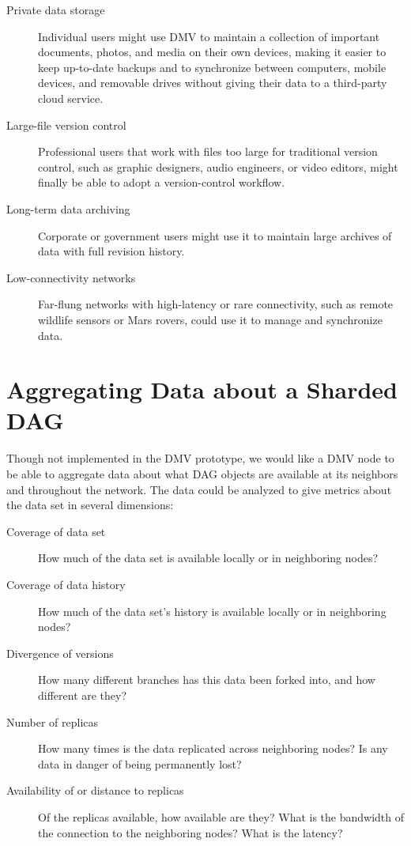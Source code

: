 \begin{description}

    \item[Private data storage] Individual users might use DMV to maintain a
        collection of important documents, photos, and media on their own
        devices, making it easier to keep up-to-date backups and to synchronize
        between computers, mobile devices, and removable drives without giving
        their data to a third-party cloud service.

    \item[Large-file version control] Professional users that work with files
        too large for traditional version control, such as graphic designers,
        audio engineers, or video editors, might finally be able to adopt a
        version-control workflow.

    \item[Long-term data archiving] Corporate or government users might use it
        to maintain large archives of data with full revision history.

    \item[Low-connectivity networks] Far-flung networks with high-latency or
        rare connectivity, such as remote wildlife sensors or Mars rovers, could
        use it to manage and synchronize data.

\end{description}

%


\section{Aggregating Data about a Sharded DAG}

Though not implemented in the DMV prototype, we would like a DMV node to be able
to aggregate data about what DAG objects are available at its neighbors and
throughout the network. The data could be analyzed to give metrics about the
data set in several dimensions:

\begin{description}

  \item[Coverage of data set] How much of the data set is available locally or
    in neighboring nodes?

  \item[Coverage of data history] How much of the data set's history is
    available locally or in neighboring nodes?

  \item[Divergence of versions] How many different branches has this data been
    forked into, and how different are they?

  \item[Number of replicas] How many times is the data replicated across
    neighboring nodes? Is any data in danger of being permanently lost?

  \item[Availability of or distance to replicas] Of the replicas available, how
    available are they? What is the bandwidth of the connection to the
    neighboring nodes? What is the latency?

\end{description}


